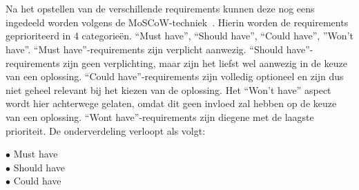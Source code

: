 \section{}
\label{sec:Indelen requirements volgens MoSCoW-techniek}

Na het opstellen van de verschillende requirements kunnen deze nog eens ingedeeld worden volgens de MoSCoW-techniek~\autocite{Ahmad2017}. Hierin worden de requirements geprioriteerd in 4 categorieën. “Must have”, “Should have”, “Could have”, ”Won't have”. “Must have”-requirements zijn verplicht aanwezig. “Should have”-requirements zijn geen verplichting, maar zijn het liefst wel aanwezig in de keuze van een oplossing. “Could have”-requirements zijn volledig optioneel en zijn dus niet geheel relevant bij het kiezen van de oplossing. Het “Won't have” aspect wordt hier achterwege gelaten, omdat dit geen invloed zal hebben op de keuze van een oplossing. “Wont have”-requirements zijn diegene met de laagste prioriteit. De onderverdeling verloopt als volgt:

\begin{description}
    \item[$\bullet$ Must have] 
    \item[$\bullet$ Should have]
    \item[$\bullet$ Could have]
\end{description}

